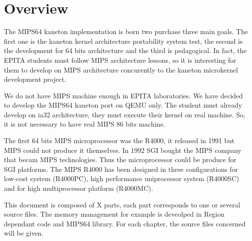 %
%
%
%
%
%

%
%

\chapter{Overview}

The MIPS64 kaneton implementation is born two purchase three main goals.
The first one is the kaneton kernel architecture portability system test,
the second is the development for 64 bits architecture and the third is pedagogical.
In fact, the EPITA students must follow MIPS architecture lessons, so it is interesting 
for them to develop on MIPS architecture concurently to the kaneton microkernel development
project.

We do not have MIPS machine enough in EPITA laboratories. We have decided to develop the MIPS64 kaneton
port on QEMU only. The student must already develop on ia32 architecture, they must execute their kernel
on real machine. So, it is not necessary to have real MIPS 86 bits machine.

The first 64 bits MIPS microprocessor was the R4000, it released in 1991 but MIPS could not produce it themselves.
In 1992 SGI bought the MIPS company that becam MIPS technologies. Thus the microprocessor could be produce for SGI platforms. The MIPS R4000 has been designed in three configurations for low-cost system (R4000PC), high performance uniprocessor system (R4000SC) and for high multiprocessor platform (R4000MC).

This document is composed of X parts, each part corresponds to one or several source files. The memory management for example is deveolped in Region dependant code and MIPS64 library. For each chapter, the source files concerned will be given.

